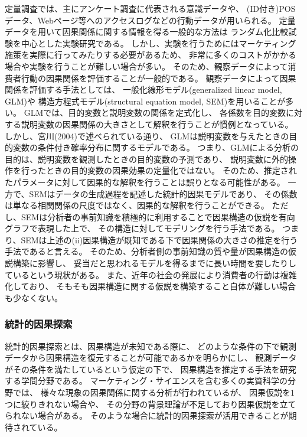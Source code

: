 定量調査では、主にアンケート調査に代表される意識データや、
(ID付き)POSデータ、Webページ等へのアクセスログなどの行動データが用いられる。
定量データを用いて因果関係に関する情報を得る一般的な方法は
ランダム化比較試験を中心とした実験研究である。
しかし、実験を行うためにはマーケティング施策を実際に行ってみたりする必要があるため、
非常に多くのコストがかかる場合や実験を行うことが難しい場合が多い。
そのため、観察データによって消費者行動の因果関係を評価することが一般的である。
観察データによって因果関係を評価する手法としては、
一般化線形モデル(generalized linear model, GLM)や
構造方程式モデル(structural equation model, SEM)を用いることが多い\cite{2015-pb}\cite{2009-qw}。
GLMでは、目的変数と説明変数の関係を定式化し、
各係数を目的変数に対する説明変数の因果関係の大きさとして解釈を行うことが慣例となっている。
しかし、宮川(2004)\cite{2004-qj}で述べられている通り、
GLMは説明変数を与えたときの目的変数の条件付き確率分布に関するモデルである。
つまり、GLMによる分析の目的は、説明変数を観測したときの目的変数の予測であり、
説明変数に外的操作を行ったときの目的変数の因果効果の定量化ではない。
そのため、推定されたパラメータに対して因果的な解釈を行うことは誤りとなる可能性がある。
一方で、SEMはデータの生成過程を記述した統計的因果モデルであり、
その係数は単なる相関関係の尺度ではなく、因果的な解釈を行うことができる\cite{2004-qj}。
ただし、SEMは分析者の事前知識を積極的に利用することで因果構造の仮説を有向グラフで表現した上で、
その構造に対してモデリングを行う手法である。
つまり、SEMは上述の(ii)因果構造が既知である下で因果関係の大きさの推定を行う手法であると言える。
そのため、分析者側の事前知識の質や量が因果構造の仮説構築に影響し、
妥当だと思われるモデルを得るまでに長い時間を要したりしているという現状がある。
また、近年の社会の発展により消費者の行動は複雑化しており、
そもそも因果構造に関する仮説を構築すること自体が難しい場合も少なくない。


\subsubsection{統計的因果探索}

統計的因果探索とは、因果構造が未知である際に、
どのような条件の下で観測データから因果構造を復元することが可能であるかを明らかにし、
観測データがその条件を満たしているという仮定の下で、
因果構造を推定する手法を研究する学問分野である。
マーケティング・サイエンスを含む多くの実質科学の分野では、
様々な現象の因果関係に関する分析が行われているが、
因果仮説を1つに絞りきれない場合や、
その分野の背景理論が不足しており因果仮説を立てられない場合がある。
そのような場合に統計的因果探索が活用できることが期待されている\cite{2017-zx}。

